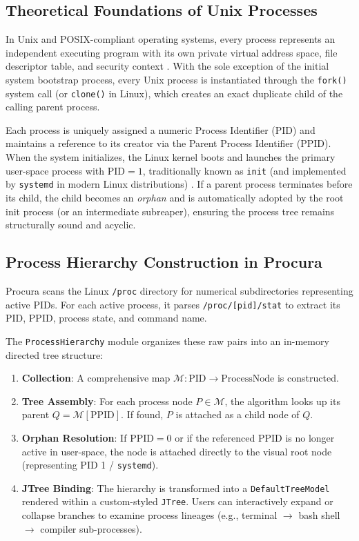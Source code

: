 \documentclass[12pt,a4paper]{article}
\begin{document}
\subsection{Theoretical Foundations of Unix Processes}
In Unix and POSIX-compliant operating systems, every process represents an independent executing program with its own private virtual address space, file descriptor table, and security context \cite{tanenbaum2014modern}. With the sole exception of the initial system bootstrap process, every Unix process is instantiated through the \texttt{fork()} system call (or \texttt{clone()} in Linux), which creates an exact duplicate child of the calling parent process.

Each process is uniquely assigned a numeric Process Identifier (PID) and maintains a reference to its creator via the Parent Process Identifier (PPID). When the system initializes, the Linux kernel boots and launches the primary user-space process with $\text{PID} = 1$, traditionally known as \texttt{init} (and implemented by \texttt{systemd} in modern Linux distributions) \cite{kerrisk2010linux}. If a parent process terminates before its child, the child becomes an \textit{orphan} and is automatically adopted by the root init process (or an intermediate subreaper), ensuring the process tree remains structurally sound and acyclic.

\subsection{Process Hierarchy Construction in Procura}
Procura scans the Linux \texttt{/proc} directory for numerical subdirectories representing active PIDs. For each active process, it parses \texttt{/proc/[pid]/stat} to extract its PID, PPID, process state, and command name.

The \texttt{ProcessHierarchy} module organizes these raw pairs into an in-memory directed tree structure:
\begin{enumerate}
    \item \textbf{Collection}: A comprehensive map $\mathcal{M}: \text{PID} \to \text{ProcessNode}$ is constructed.
    \item \textbf{Tree Assembly}: For each process node $P \in \mathcal{M}$, the algorithm looks up its parent $Q = \mathcal{M}[\text{PPID}]$. If found, $P$ is attached as a child node of $Q$.
    \item \textbf{Orphan Resolution}: If $\text{PPID} = 0$ or if the referenced PPID is no longer active in user-space, the node is attached directly to the visual root node (representing PID 1 / \texttt{systemd}).
    \item \textbf{JTree Binding}: The hierarchy is transformed into a \texttt{DefaultTreeModel} rendered within a custom-styled \texttt{JTree}. Users can interactively expand or collapse branches to examine process lineages (e.g., terminal $\to$ bash shell $\to$ compiler sub-processes).
\end{enumerate}
\end{document}
